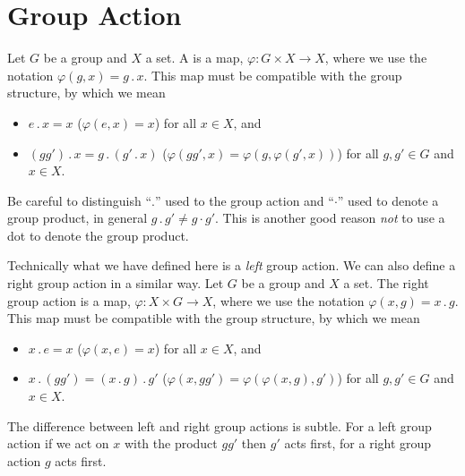 \documentclass[fleqn]{NotesClass}
\newcommand*{\action}{\mathbin{.}}
\begin{document}
    \section{Group Action}
    \begin{dfn}{}{}
        Let \(G\) be a group and \(X\) a set.
        A  is a map, \(\varphi\colon G \times X \to X\), where we use the notation \(\varphi(g, x) = g\action x\).
        This map must be compatible with the group structure, by which we mean
        \begin{itemize}
            \item \(e\action x = x\) (\(\varphi(e, x) = x\)) for all \(x \in X\), and
            \item \((gg')\action x = g\action(g'\action x)\) (\(\varphi(gg', x) = \varphi(g, \varphi(g', x))\)) for all \(g, g' \in G\) and \(x \in X\).
        \end{itemize}
    \end{dfn}

    \begin{wrn}
        Be careful to distinguish \enquote{\(\action\)} used to the group action and \enquote{\(\cdot\)} used to denote a group product, in general \(g\action g' \ne g\cdot g'\).
        This is another good reason \emph{not} to use a dot to denote the group product.
    \end{wrn}

    \begin{rmk}
        Technically what we have defined here is a \emph{left} group action.
        We can also define a right group action in a similar way.
        Let \(G\) be a group and \(X\) a set.
        The right group action is a map, \(\varphi\colon X \times G \to X\), where we use the notation \(\varphi(x, g) = x\action g\). 
        This map must be compatible with the group structure, by which we mean
        \begin{itemize}
            \item \(x \action e = x\) (\(\varphi(x, e) = x\)) for all \(x \in X\), and
            \item \(x \action (gg') = (x \action g) \action g'\) (\(\varphi(x, gg') = \varphi(\varphi(x, g), g')\)) for all \(g, g' \in G\) and \(x \in X\).
        \end{itemize}
        The difference between left and right group actions is subtle.
        For a left group action if we act on \(x\) with the product \(gg'\) then \(g'\) acts first, for a right group action \(g\) acts first.
    \end{rmk}
    
\end{document}
